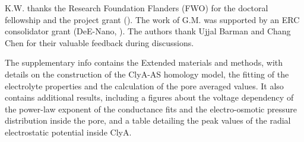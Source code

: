 \documentclass[journal=ancac3,manuscript=article,etalmode=truncate,maxauthors=0,layout=twocolumn]{achemso}
\begin{document}
\begin{acknowledgement}
K.W. thanks the Research Foundation Flanders (FWO) for the doctoral fellowship and the project grant 
(). The work of G.M. was supported by an ERC consolidator grant (DeE-Nano, ).
The authors thank Ujjal Barman and Chang Chen for their valuable feedback during discussions.
\end{acknowledgement}


\begin{suppinfo}
	The supplementary info contains the Extended materials and methods, with details on the construction of the 
	ClyA-AS homology model, the fitting of the electrolyte properties and the calculation of the pore averaged 
	values. It also contains additional results, including a figures about the voltage dependency of the 
	power-law exponent of the conductance fits and the electro-osmotic pressure distribution inside the pore, 
	and a table detailing the peak values of the radial electrostatic potential inside ClyA.
\end{suppinfo}




%
\end{document}
